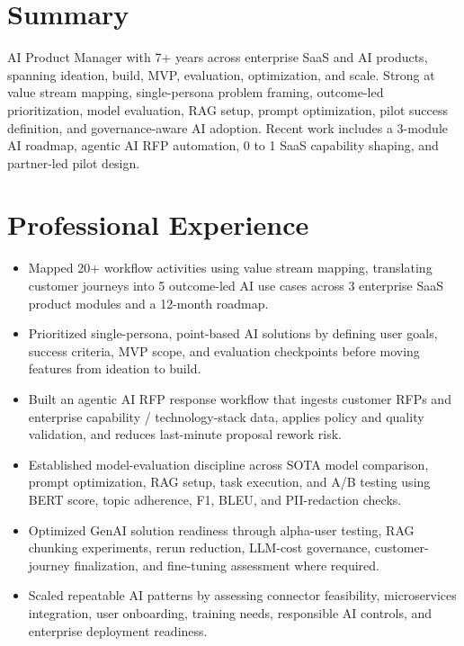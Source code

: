 \documentclass[10pt]{article}
\begin{document}
\fontsize{9.8pt}{11.7pt}\selectfont


\section{Summary}
AI Product Manager with 7+ years across enterprise SaaS and AI products, spanning ideation, build, MVP, evaluation, optimization, and scale. Strong at value stream mapping, single-persona problem framing, outcome-led prioritization, model evaluation, RAG setup, prompt optimization, pilot success definition, and governance-aware AI adoption. Recent work includes a 3-module AI roadmap, agentic AI RFP automation, 0 to 1 SaaS capability shaping, and partner-led pilot design.

\section{Professional Experience}
\begin{itemize}
  \item Mapped 20+ workflow activities using value stream mapping, translating customer journeys into 5 outcome-led AI use cases across 3 enterprise SaaS product modules and a 12-month roadmap.
  \item Prioritized single-persona, point-based AI solutions by defining user goals, success criteria, MVP scope, and evaluation checkpoints before moving features from ideation to build.
  \item Built an agentic AI RFP response workflow that ingests customer RFPs and enterprise capability / technology-stack data, applies policy and quality validation, and reduces last-minute proposal rework risk.
  \item Established model-evaluation discipline across SOTA model comparison, prompt optimization, RAG setup, task execution, and A/B testing using BERT score, topic adherence, F1, BLEU, and PII-redaction checks.
  \item Optimized GenAI solution readiness through alpha-user testing, RAG chunking experiments, rerun reduction, LLM-cost governance, customer-journey finalization, and fine-tuning assessment where required.
  \item Scaled repeatable AI patterns by assessing connector feasibility, microservices integration, user onboarding, training needs, responsible AI controls, and enterprise deployment readiness.
\end{itemize}
\end{document}
